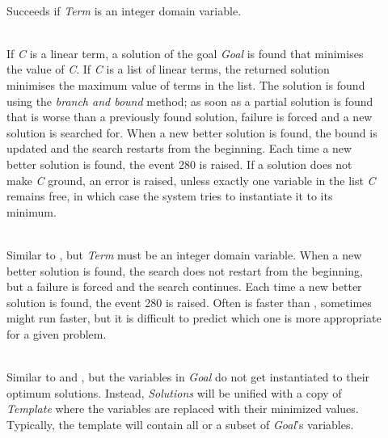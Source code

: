 \begin{description}
\item[] \ \\
Succeeds if {\it Term} is an integer domain variable.

\item[] \ \\
If {\it C} is a linear term,
a solution of the goal {\it Goal} is found that minimises the
value of {\it C}.
If {\it C} is a list of linear terms, the returned solution
minimises the maximum value of terms in the list.
The solution is found using the {\it branch and bound} method;
as soon as a partial solution is found that is worse than a previously
found solution, failure is forced and a new solution is searched for.
When a new better solution is found, the bound is updated and
the search restarts from the beginning.
Each time a new better solution is found, the event 280 is raised.
If a solution does not make {\it C} ground, an error is raised,
unless exactly one variable in the list {\it C} remains free,
in which case the system tries to instantiate it to its minimum.

\item[] \ \\
Similar to , but {\it Term} must be an integer domain variable.
When a new better solution is found, the search does not restart
from the beginning, but a failure is forced and the search continues.
Each time a new better solution is found, the event 280 is raised.
Often  is faster than , sometimes
 might run faster, but it is difficult to predict 
which one is more appropriate for a given problem.

\item[] 
\item[] \ \\
Similar to 
and ,
but the variables in {\it Goal} do not get
instantiated to their optimum solutions. Instead, {\it Solutions} will
be unified with a copy of {\it Template} where the variables are replaced
with their minimized values.  Typically, the template will contain
all or a subset of {\it Goal}'s variables.


\end{description}
